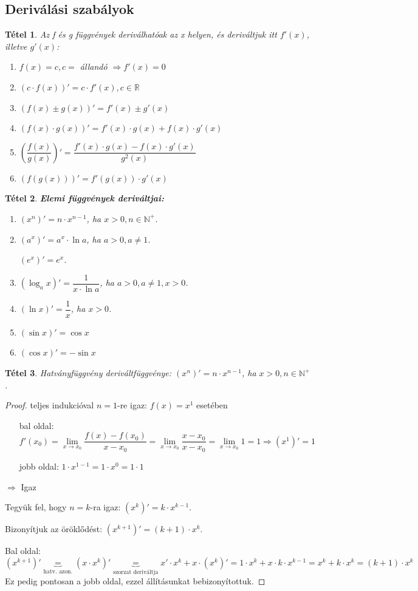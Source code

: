 \documentclass[12pt,a4paper]{article}
\newtheorem{theorem}{Tétel} [section]
\begin{document}
\subsection{Deriválási szabályok}
\begin{theorem}
Az f és g függvények deriválhatóak az x helyen, és deriváltjuk itt $f'(x)$, illetve $g'(x)$:
\begin{enumerate}
\item $f(x)=c, c =$ állandó $\Rightarrow f'(x)=0$
\item $(c\cdot f(x))'=c\cdot f'(x), c\in\mathbb{R}$
\item $(f(x)\pm g(x))'=f'(x)\pm g'(x)$
\item $(f(x)\cdot g(x))'=f'(x)\cdot g(x) + f(x)\cdot g'(x)$
\item $\left(\dfrac{f(x)}{g(x)} \right)'=\dfrac{f'(x)\cdot g(x) - f(x)\cdot g'(x)}{g^2(x)}$
\item $(f(g(x)))'=f'(g(x))\cdot g'(x)$
\end{enumerate}
\end{theorem}
\begin{theorem}
\textbf{Elemi függvények deriváltjai:}
\begin{enumerate}
\item $(x^n)'=n\cdot x^{n-1}$, ha $x>0, n\in\mathbb{N}^+$.
\item $(a^x)'=a^x\cdot \ln a$, ha $a>0, a\neq 1$.

$(e^x)'=e^x$.
\item $(\log_a x)'=\dfrac{1}{x\cdot \ln a}$, ha $a>0, a\neq 1, x>0$.
\item $(\ln x)'=\dfrac{1}{x}$, ha $x>0$.
\item $(\sin x)'=\cos x$
\item $(\cos x)'=-\sin x$
\end{enumerate}
\end{theorem}
\newpage
\begin{theorem}
Hatványfüggvény deriváltfüggvénye: $(x^n)'=n\cdot x^{n-1}$, ha $x>0, n\in\mathbb{N}^+$.
\end{theorem}
\begin{proof}
teljes indukcióval
$n=1$-re igaz: $f(x)=x^1$ esetében
\begin{itemize}
\item [bal oldal:] $f'(x_0)=\lim\limits_{x\to x_0}\dfrac{f(x)-f(x_0)}{x-x_0}=\lim\limits_{x\to x_0}\dfrac{x-x_0}{x-x_0}=\lim\limits_{x\to x_0}1=1\Rightarrow (x^1)'=1$
\item [jobb oldal:] $1\cdot x^{1-1}=1\cdot x^0=1\cdot 1$
\end{itemize}
$\Rightarrow$ Igaz

Tegyük fel, hogy $n = k$-ra igaz: $(x^k)'=k\cdot x^{k-1}$.

Bizonyítjuk az öröklődést: $(x^{k+1})'=(k+1)\cdot x^k$.

Bal oldal:
$$(x^{k+1})'\underbrace{=}_{\text{hatv. azon.}}(x\cdot x^k)'\underbrace{=}_{\text{szorzat deriváltja}}x'\cdot x^k+x\cdot (x^k)'=1\cdot x^k+x\cdot k \cdot x^{k-1}=x^k+k\cdot x^k=(k+1)\cdot x^k$$
Ez pedig pontosan a jobb oldal, ezzel állításunkat bebizonyítottuk.
\end{proof}
\end{document}
